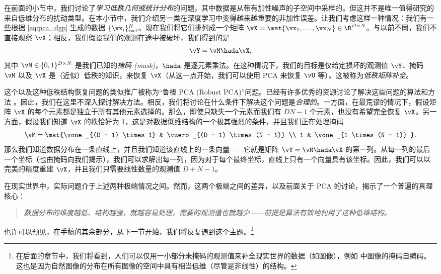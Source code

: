 \documentclass[../../book-main_zh.tex]{subfiles}
\begin{document}
在前面的小节中，我们讨论了\textit{学习低秩几何或统计分布}的问题，其中数据是从带有加性噪声的子空间中采样的。但这并不是唯一值得研究的来自低维分布的扰动类型。在本小节中，我们介绍另一类在深度学习中变得越来越重要的非加性误差。让我们考虑这样一种情况：我们有一些根据
\eqref{eq:pca_dgp} 生成的数据 \(\{\vx_{i}\}_{i = 1}^{N}\)。现在我们将它们排列成一个矩阵
\(\vX = \mat{\vx_{1}, \dots, \vx_{N}} \in \R^{D \times
N}\)。与以前不同，我们不直接观察 \(\vX\)；相反，我们假设我们的观测在途中被破坏，我们得到的是
\begin{equation}
    \vY = \vM \hada \vX,
\end{equation}
其中 \(\vM \in \{0, 1\}^{D \times N}\) 是我们已知的\textit{掩码
(mask)}，\(\hada\) 是逐元素乘法。在这种情况下，我们的目标是仅给定损坏的观测值 \(\vY\)、掩码 \(\vM\) 以及
\(\vX\) 是（近似）低秩的知识，来恢复 \(\vX\)（从这一点开始，我们可以使用 PCA 来恢复 \(\vU\)
等）。这被称为\textit{低秩矩阵补全}。

这个以及这种低秩结构恢复问题的类似推广被称为“鲁棒 PCA (Robust
PCA)”问题。已经有许多优秀的资源讨论了解决这些问题的算法和方法
\cite{Wright-Ma-2022}。因此，我们在这里不深入探讨解决方法。相反，我们将讨论在什么条件下解决这个问题是\textit{合理的}。一方面，在最荒谬的情况下，假设矩阵
\(\vX\) 的每个元素都是独立于所有其他元素选择的。那么，即使只缺失一个元素而我们有 \(DN - 1\) 个元素，也没有希望完全恢复
\(\vX\)。另一方面，假设我们知道 \(\vX\) 的秩恰好为 1，这是对数据低维结构的一个极其强烈的条件，并且我们正在处理掩码
\begin{equation}
    \vM = \mat{\vone_{(D - 1) \times 1} & \vzero_{(D - 1) \times (N -
    1)} \\ 1 & \vone_{1 \times (N - 1)} }.
\end{equation}
那么我们知道数据分布在一条直线上，并且我们知道该直线上的一条向量——它就是矩阵 \(\vY = \vM
\hada \vX\)
的第一列。从每一列的最后一个坐标（也由掩码向我们揭示），我们可以求解出每一列，因为对于每个最终坐标，直线上只有一个向量具有该坐标。因此，我们可以以完美的精度重建
\(\vX\)，并且我们只需要线性数量的观测值 \(D + N - 1\)。

在现实世界中，实际问题介于上述两种极端情况之间。然而，这两个极端之间的差异，以及前面关于 PCA 的讨论，揭示了一个普遍的真理核心：
\begin{quote}
    \centering
    \textit{数据分布的维度越低、结构越强，就越容易处理，需要的观测值也就越少——前提是算法有效地利用了这种低维结构。}
\end{quote}
也许可以预见，在手稿的其余部分，从下一节开始，我们将反复遇到这个主题。\footnote{在后面的章节中，我们将看到，人们可以仅用一小部分未掩码的观测值来补全现实世界的数据（如图像），例如
 中图像的掩码自编码。这也是因为自然图像的分布在所有图像的空间中具有相当低维（尽管是非线性）的结构。}
\end{document}
